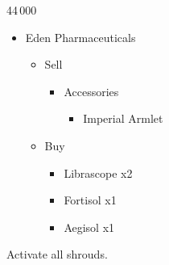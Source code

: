 	\begin{shop}{44\,000}
		\begin{itemize}
			\item Eden Pharmaceuticals
			      \begin{itemize}
				      \item Sell
				            \begin{itemize}
					            \item Accessories
					                  \begin{itemize}
						                  \item Imperial Armlet
					                  \end{itemize}
				            \end{itemize}
				      \item Buy
				            \begin{itemize}
					            \item Librascope x2
					            \item Fortisol x1
					            \item Aegisol x1
				            \end{itemize}
			      \end{itemize}
		\end{itemize}
	\end{shop}
	Activate all shrouds.
\vfill
